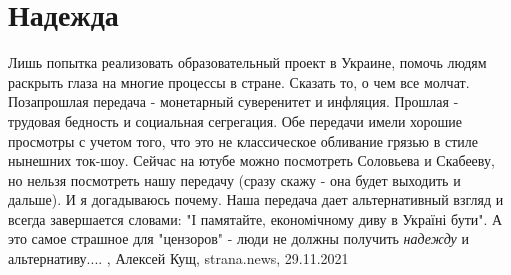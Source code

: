  
 
 
 
 
\chapter{Надежда}
\label{sec:slova.nadezhda}

Лишь попытка реализовать образовательный проект в Украине, помочь людям
раскрыть глаза на многие процессы в стране.  Сказать то, о чем все молчат.
Позапрошлая передача - монетарный суверенитет и инфляция.  Прошлая - трудовая
бедность и социальная сегрегация.  Обе передачи имели хорошие просмотры с
учетом того, что это не классическое обливание грязью в стиле нынешних ток-шоу.
Сейчас на ютубе можно посмотреть Соловьева и Скабееву, но нельзя посмотреть
нашу передачу (сразу скажу - она будет выходить и дальше).  И я догадываюсь
почему.  Наша передача дает альтернативный взгляд и всегда завершается словами:
"І памятайте, економічному диву в Україні бути".  А это самое страшное для
"цензоров" - люди не должны получить \emph{надежду} и альтернативу....
, 
Алексей Кущ, strana.news, 29.11.2021
